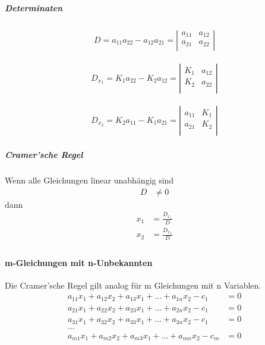 \subparagraph{Determinaten}
\begin{align*}
D= a_{11} a_{22} - a_{12} a_{21} = \left|
    \begin{array}{ccc}
       a_{11} & a_{12} \\
       a_{21} & a_{22} \\
    \end{array}
    \right|
\end{align*}

\begin{align*}
D_{{x}_1}= K_1 a_{22} - K_2 a_{12} = \left|
     \begin{array}{ccc}
        K_1 & a_{12} \\
        K_2 & a_{22} \\
     \end{array}
     \right|
\end{align*}

\begin{align*}
D_{{x}_2}= K_2 a_{11} - K_1 a_{21} = \left|
     \begin{array}{ccc}
        a_{11} & K_1 \\
        a_{21} & K_2 \\
     \end{array}
     \right|
\end{align*}

\subparagraph{Cramer'sche Regel}
Wenn alle Gleichungen linear unabhängig sind
\begin{align*}
D &\neq 0
\end{align*}
dann
\begin{align*}
x_1 &= \frac{ D_{{x}_1} }{D} \\
x_2 &= \frac{ D_{{x}_2} }{D} \\
\end{align*}



\paragraph{m-Gleichungen mit n-Unbekannten}
Die Cramer'sche Regel gilt analog für m Gleichungen mit n Variablen.
\begin{align*}
a_{11}x_{1}+a_{12}x_{2}+a_{13}x_{1}+...+a_{1n}x_{2}-c_{1}&=0 \\
a_{21}x_{1}+a_{22}x_{2}+a_{23}x_{1}+...+a_{2n}x_{2}-c_{1}&=0 \\
a_{31}x_{1}+a_{32}x_{2}+a_{33}x_{1}+...+a_{3n}x_{2}-c_{1}&=0 \\
...\\
a_{m1}x_{1}+a_{m2}x_{2}+a_{m3}x_{1}+...+a_{mn}x_{2}-c_{m}&=0 \\
\end{align*}

